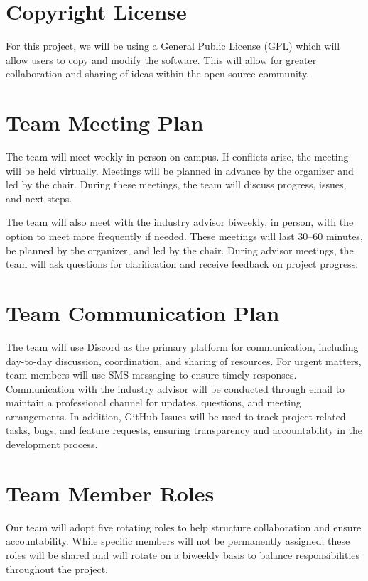 \documentclass{article}
\begin{document}
\section{Copyright License}

For this project, we will be using a General Public License (GPL) which will allow users to copy and modify the software. This will allow for greater collaboration and sharing of ideas within the open-source community.

\section{Team Meeting Plan}

The team will meet weekly in person on campus. If conflicts arise, the meeting will be held virtually. Meetings will be planned in advance by the organizer and led by the chair. During these meetings, the team will discuss progress, issues, and next steps.

The team will also meet with the industry advisor biweekly, in person, with the option to meet more frequently if needed. These meetings will last 30–60 minutes, be planned by the organizer, and led by the chair. During advisor meetings, the team will ask questions for clarification and receive feedback on project progress.

\section{Team Communication Plan}

The team will use Discord as the primary platform for communication, including day-to-day
discussion, coordination, and sharing of resources. For urgent matters, team members will
use SMS messaging to ensure timely responses. Communication with the industry advisor will
be conducted through email to maintain a professional channel for updates, questions, and
meeting arrangements. In addition, GitHub Issues will be used to track project-related tasks,
bugs, and feature requests, ensuring transparency and accountability in the development process.

\section{Team Member Roles}

Our team will adopt five rotating roles to help structure collaboration and ensure accountability.
While specific members will not be permanently assigned, these roles will be shared and will
rotate on a biweekly basis to balance responsibilities throughout the project.
\end{document}
